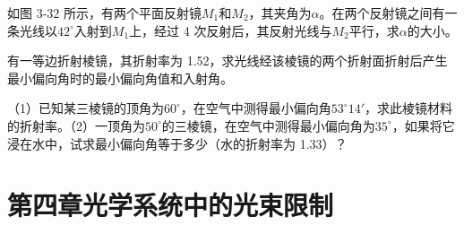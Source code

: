 \documentclass[standard, analysis, notocnum]{ExBook}
\newcommand{\answerarea}[1][8cm]{%
  \par\vspace{2mm}%
  \noindent{\color{themeColor!35}\rule{\linewidth}{0.4pt}}\par
  \noindent\begin{minipage}[t][#1][t]{\linewidth}\vspace{0pt}\end{minipage}\par
  \noindent{\color{themeColor!35}\rule{\linewidth}{0.4pt}}\par
}
\begin{document}
\begin{qitems}[startnum=5]
\qitem 如图 3-32 所示，有两个平面反射镜$M_{1}$和$M_{2}$，其夹角为$\alpha$。在两个反射镜之间有一条光线以$42^{\circ}$入射到$M_{1}$上，经过 4 次反射后，其反射光线与$M_{2}$平行，求$\alpha$的大小。
\label{q:66:start}
\answerarea[8cm]
\label{q:66:end}
\end{qitems}

\begin{qitems}[startnum=6]
\qitem 有一等边折射棱镜，其折射率为 1.52，求光线经该棱镜的两个折射面折射后产生最小偏向角时的最小偏向角值和入射角。
\label{q:67:start}
\answerarea[8cm]
\label{q:67:end}
\end{qitems}

\begin{qitems}[startnum=7]
\qitem （1）已知某三棱镜的顶角为$60^{\circ}$，在空气中测得最小偏向角$53^{\circ}14'$，求此棱镜材料的折射率。（2）一顶角为$50^{\circ}$的三棱镜，在空气中测得最小偏向角为$35^{\circ}$，如果将它浸在水中，试求最小偏向角等于多少（水的折射率为 1.33）？
\label{q:68:start}
\answerarea[8cm]
\label{q:68:end}
\end{qitems}

\section{第四章\quad 光学系统中的光束限制}
\end{document}
